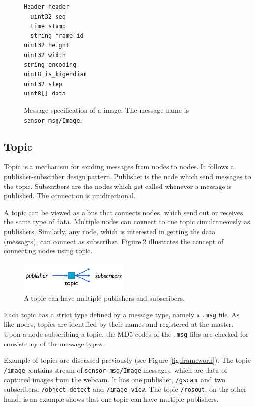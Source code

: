 \documentclass[a4paper, 10pt, conference]{ieeeconf}       %
\begin{document}
\begin{figure}[htpb]
  \centering
\begin{Verbatim}[frame=single]
Header header 
  uint32 seq 
  time stamp 
  string frame_id 
uint32 height 
uint32 width 
string encoding 
uint8 is_bigendian 
uint32 step 
uint8[] data
\end{Verbatim}
  \caption{Message specification of a image. The message name is \texttt{sensor\_msg/Image}.}
  \label{fig:message}
\end{figure}

\subsection{Topic}

Topic is a mechanism for sending messages from nodes to nodes. It follows a publisher-subscriber design pattern. Publisher is the node which send messages to the topic. Subscribers are the nodes which get called whenever a message is published. The connection is unidirectional.

A topic can be viewed as a bus that connects nodes, which send out or receives the same type of data. Multiple nodes can connect to one topic simultaneously as publishers. Similarly, any node, which is interested in getting the data (messages), can connect as subscriber. Figure 
\ref{fig:topic} illustrates the concept of connecting nodes using topic.

\begin{figure}[htpb]
  \centering
  \includegraphics[width=0.48\textwidth]{topic}
  \caption{A topic can have multiple publishers and subscribers.}
  \label{fig:topic}
\end{figure}

Each topic has a strict type defined by a message type, namely a \texttt{.msg} file. As like nodes, topics are identified by their names and registered at the master. Upon a node subscribing a topic, the MD5 codes of the \texttt{.msg} files are checked for consistency of the message types.

Example of topics are discussed previously (see Figure \ref{fig:framework}). The topic \texttt{/image} contains stream of \texttt{sensor\_msg/Image} messages, which are data of captured images from the webcam. It has one publisher, \texttt{/gscam}, and two subscribers, \texttt{/object\_detect} and \texttt{/image\_view}. The topic \texttt{/rosout}, on the other hand, is an example shows that one topic can have multiple publishers.
\end{document}
